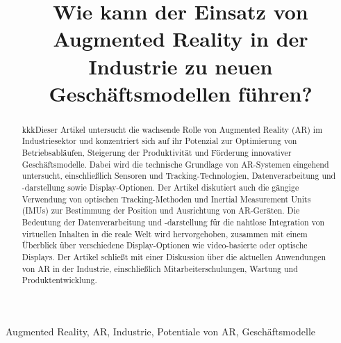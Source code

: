 \documentclass[conference]{IEEEtran}
\title{ Wie kann der Einsatz von Augmented Reality in der Industrie zu neuen Geschäftsmodellen führen?}
\author{
	\IEEEauthorblockN{Simon Kuhn}
	\IEEEauthorblockA{
		\textit{Technische Hochschule Ingolstadt} \\
		16. Juni 2023 %
	}
}
\begin{document}
\maketitle
\begin{abstract}
	kkkDieser Artikel untersucht die wachsende Rolle von Augmented Reality (AR) im Industriesektor
	und konzentriert sich auf ihr Potenzial zur Optimierung von Betriebsabläufen,
	Steigerung der Produktivität und Förderung innovativer Geschäftsmodelle.
	Dabei wird die technische Grundlage von AR-Systemen eingehend untersucht,
	einschließlich Sensoren und Tracking-Technologien, Datenverarbeitung und
	-darstellung sowie Display-Optionen. Der Artikel diskutiert auch die gängige
	Verwendung von optischen Tracking-Methoden und Inertial Measurement Units (IMUs)
	zur Bestimmung der Position und Ausrichtung von AR-Geräten. Die Bedeutung der
	Datenverarbeitung und -darstellung für die nahtlose Integration von virtuellen
	Inhalten in die reale Welt wird hervorgehoben, zusammen mit einem Überblick über
	verschiedene Display-Optionen wie video-basierte oder optische Displays. Der Artikel
	schließt mit einer Diskussion über die aktuellen Anwendungen von AR in der Industrie,
	einschließlich Mitarbeiterschulungen, Wartung und Produktentwicklung.
\end{abstract}
\begin{IEEEkeywords}
	Augmented Reality, AR, Industrie, Potentiale von AR, Geschäftsmodelle
\end{IEEEkeywords}






\printbibliography
\end{document}
